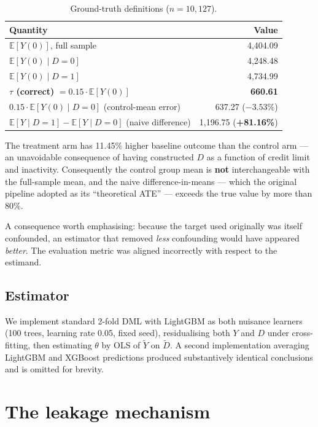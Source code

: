 \documentclass[11pt]{article}
\begin{document}
\begin{table}[htbp]
\centering
\caption{Ground-truth definitions ($n = 10{,}127$).}
\label{tab:truth}
\begin{tabular}{lr}
\toprule
Quantity & Value \\
\midrule
$\mathbb{E}[Y(0)]$, full sample & 4,404.09 \\
$\mathbb{E}[Y(0) \mid D = 0]$ & 4,248.48 \\
$\mathbb{E}[Y(0) \mid D = 1]$ & 4,734.99 \\
\textbf{$\tau$ (correct)} $= 0.15 \cdot \mathbb{E}[Y(0)]$ & \textbf{660.61} \\
$0.15 \cdot \mathbb{E}[Y(0)\mid D=0]$ (control-mean error) & 637.27 \; ($-3.53\%$) \\
$\mathbb{E}[Y\mid D=1] - \mathbb{E}[Y\mid D=0]$ (naive difference) & 1,196.75 \; (\textbf{+81.16\%}) \\
\bottomrule
\end{tabular}
\end{table}

The treatment arm has 11.45\% higher baseline outcome than the control arm --- an unavoidable consequence of having constructed $D$ as a function of credit limit and inactivity. Consequently the control group mean is \textbf{not} interchangeable with the full-sample mean, and the naive difference-in-means --- which the original pipeline adopted as its ``theoretical ATE'' --- exceeds the true value by more than 80\%.

A consequence worth emphasising: because the target used originally was itself confounded, an estimator that removed \emph{less} confounding would have appeared \emph{better}. The evaluation metric was aligned incorrectly with respect to the estimand.

\subsection{Estimator}

We implement standard 2-fold DML with LightGBM as both nuisance learners (100 trees, learning rate 0.05, fixed seed), residualising both $Y$ and $D$ under cross-fitting, then estimating $\theta$ by OLS of $\tilde{Y}$ on $\tilde{D}$. A second implementation averaging LightGBM and XGBoost predictions produced substantively identical conclusions and is omitted for brevity.

\section{The leakage mechanism}
\end{document}
